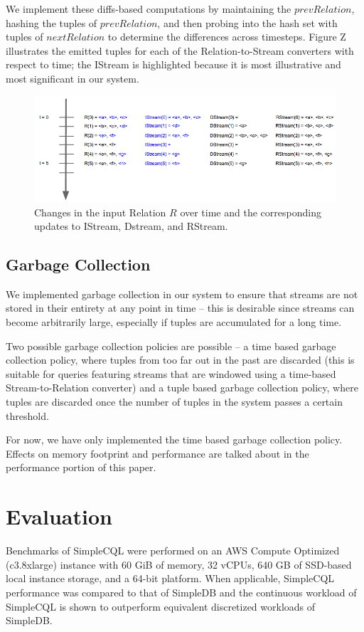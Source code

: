 \documentclass[a4paper, 10pt, conference]{IEEEconf}
\begin{document}
We implement these diffs-based computations by maintaining the $prevRelation$, hashing the tuples of $prevRelation$, and then probing into the hash set with tuples of $nextRelation$ to determine the differences across timesteps. Figure Z illustrates the emitted tuples for each of the Relation-to-Stream converters with respect to time; the IStream is highlighted because it is most illustrative and most significant in our system. 

\begin{figure}[h!]
    \centering
    \centerline{\includegraphics[totalheight=3cm]{stream_converter.png}}
    \caption{Changes in the input Relation $R$ over time and the corresponding updates to IStream, Dstream, and RStream.}
    \label{fig:stream_converter}
\end{figure}


\subsection{Garbage Collection}
We implemented garbage collection in our system to ensure that streams are not stored in their entirety at any point in time -- this is desirable since streams can become arbitrarily large, especially if tuples are accumulated for a long time.

Two possible garbage collection policies are possible -- a time based garbage collection policy, where tuples from too far out in the past are discarded (this is suitable for queries featuring streams that are windowed using a time-based Stream-to-Relation converter) and a tuple based garbage collection policy, where tuples are discarded once the number of tuples in the system passes a certain threshold.

For now, we have only implemented the time based garbage collection policy. Effects on memory footprint and performance are talked about in the performance portion of this paper.


\section{Evaluation}
Benchmarks of SimpleCQL were performed on an AWS Compute Optimized (c3.8xlarge) instance with 60 GiB of memory, 32 vCPUs, 640 GB of SSD-based local instance storage, and a 64-bit platform.  When applicable, SimpleCQL performance was compared to that of SimpleDB and the continuous workload of SimpleCQL is shown to outperform equivalent discretized workloads of SimpleDB.  
\end{document}

